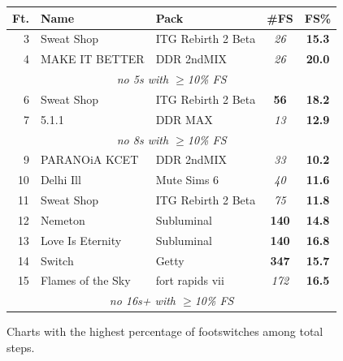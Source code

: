 \documentclass[10pt]{sigplanconf}
\begin{document}
\begin{figure}[t]
	\begin{center}
		\small
	\begin{tabular}{r|l|l|c|c}
		\bf Ft. & \bf Name & \bf Pack & \bf \#FS & \bf FS\% \\
		\hline
		 3 & Sweat Shop       & ITG Rebirth 2 Beta    & \em  26 & \bf 15.3 \\
		 4 & MAKE IT BETTER   & DDR 2ndMIX            & \em  26 & \bf 20.0 \\
		\multicolumn{5}{c}{\em no 5s with $\ge$10\% FS} \\
		 6 & Sweat Shop       & ITG Rebirth 2 Beta    & \bf  56 & \bf 18.2 \\
		 7 & 5.1.1            & DDR MAX               & \em  13 & \bf 12.9 \\
		\multicolumn{5}{c}{\em no 8s with $\ge$10\% FS} \\
		 9 & PARANOiA KCET    & DDR 2ndMIX            & \em  33 & \bf 10.2 \\
		10 & Delhi Ill        & Mute Sims 6           & \em  40 & \bf 11.6 \\
		11 & Sweat Shop       & ITG Rebirth 2 Beta    & \em  75 & \bf 11.8 \\
		12 & Nemeton          & Subluminal            & \bf 140 & \bf 14.8 \\
		13 & Love Is Eternity & Subluminal            & \bf 140 & \bf 16.8 \\
		14 & Switch           & Getty                 & \bf 347 & \bf 15.7 \\
		15 & Flames of the Sky & fort rapids vii      & \em 172 & \bf 16.5 \\
		\multicolumn{5}{c}{\em no 16s+ with $\ge$10\% FS} \\
	\end{tabular}
	\end{center}
	\caption{Charts with the highest percentage of footswitches among total steps.}
\end{figure}
\end{document}
